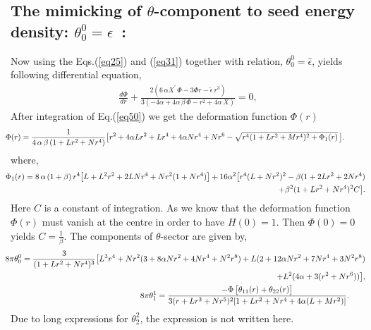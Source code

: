 \documentclass[]{aastex631}
\begin{document}
\subsection{The mimicking of $\theta$-component to seed energy density: $\theta^0_0=\hat{\epsilon}$~:} \label{sec3.1}  
Now using the Eqs.(\ref{eq25}) and (\ref{eq31}) together with relation,  $\theta^0_0=\hat{\epsilon}$, yields following differential equation, 
\begin{eqnarray}
\frac{d\Phi}{dr}+\frac{2 (6\, \alpha X^{\prime}\,\Phi - 3 \Phi r - \hat{\epsilon}\, r^3)}{
 3 (-4 \alpha + 4 \alpha\, \beta\, \Phi - r^2 + 4 \alpha\,X)}=0,\label{eq50}
\end{eqnarray}
After integration of Eq.(\ref{eq50}) we get the deformation function $\Phi(r)$ 
\begin{eqnarray}
&&\hspace{-0.6cm} \Phi(r)=\frac{1}{4 \,\alpha\,\beta\, (1 + L r^2 + N r^4)}\big[r^2 + 4 \alpha L r^2 + L r^4 + 4 \alpha N r^4 + N r^6-\sqrt{r^4 (1 + L r^2 + M r^4)^2 +\Phi_1(r)}\,\big].~~~~~~~~  \label{eq51}
\end{eqnarray}
where,
\begin{eqnarray}
&&\hspace{-0.6cm}\Phi_1(r)=8\,\alpha\, (1 + \beta)\, r^4 \big[L + L^2 r^2 + 2 L N r^4 + N r^2 (1 + N r^4)\big]  + 16 \alpha^2 \big[r^4 (L + N r^2)^2 - \beta (1 + 2 L r^2 + 2 N r^4)\nonumber\\&&\hspace{0.6cm} +  \beta^2  (1 + L r^2 + N r^4)^2 C\big].\nonumber
\end{eqnarray}
Here $C$ is a constant of integration. As we know that the deformation function $\Phi(r)$ must vanish at the centre in order to have $H(0)=1$. Then $\Phi(0)=0$ yields $C=\frac{1}{\beta}$.  
The components of $\theta$-sector are given by,
\begin{eqnarray}
&&\hspace{-0.6cm} 8\pi\theta^0_0=\frac{3}{(1 + L r^2 + N r^4)^3} \big[L^3 r^4 + N r^2 (3 + 8 \alpha N r^2 + 4 N r^4 + N^2 r^8) + L (2 + 12 \alpha N r^2 + 7 N r^4 + 3 N^2 r^8) \nonumber\\&& \hspace{0.4cm} + L^2 (4 \alpha  + 3 (r^2 + N r^6))\big],  \label{eq52}\\
&&\hspace{-0.6cm} 8\pi\theta^1_1=\frac{-\Phi\,\big[\theta_{11}(r)+\theta_{22}(r)\big]}{3 (r + L r^3 + N r^5)^2 [1 + L r^2 + N r^4 + 4 \alpha (L + M r^2)]}.~~~~~~  \label{eq53}
\end{eqnarray}
Due to long expressions for $\theta^2_2$, the expression is not written here. 
\end{document}

